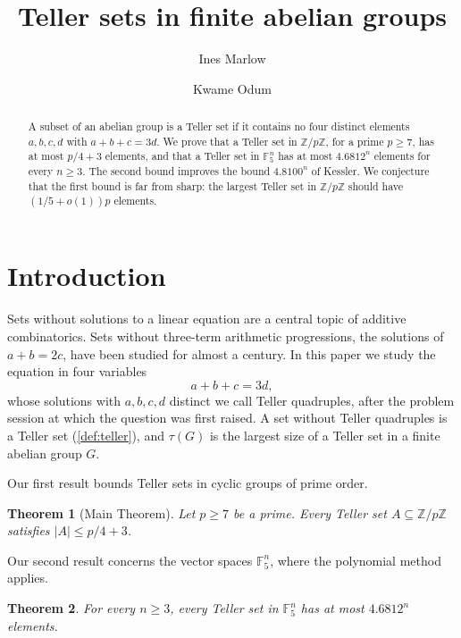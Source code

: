 \documentclass[11pt]{amsart}
\newtheorem{thm}{Theorem}[section]
\theoremstyle{definition}
\numberwithin{equation}{section}
\newcommand{\F}{\mathbb{F}}
\newcommand{\Z}{\mathbb{Z}}
\begin{document}
\title{Teller sets in finite abelian groups}
\author{Ines Marlow}
\author{Kwame Odum}

\begin{abstract}
A subset of an abelian group is a Teller set if it contains no four distinct elements $a, b, c, d$ with $a + b + c = 3d$. We prove that a Teller set in $\Z/p\Z$, for a prime $p \geq 7$, has at most $p/4 + 3$ elements, and that a Teller set in $\F_5^n$ has at most $4.6812^n$ elements for every $n \geq 3$. The second bound improves the bound $4.8100^n$ of Kessler. We conjecture that the first bound is far from sharp: the largest Teller set in $\Z/p\Z$ should have $(1/5 + o(1))p$ elements.
\end{abstract}

\maketitle

\section{Introduction}\label{sec:intro}

Sets without solutions to a linear equation are a central topic of additive combinatorics. Sets without three-term arithmetic progressions, the solutions of $a + b = 2c$, have been studied for almost a century. In this paper we study the equation in four variables
\begin{equation}\label{eq:teller}
a + b + c = 3d,
\end{equation}
whose solutions with $a, b, c, d$ distinct we call Teller quadruples, after the problem session at which the question was first raised. A set without Teller quadruples is a Teller set (\cref{def:teller}), and $\tau(G)$ is the largest size of a Teller set in a finite abelian group $G$.

Our first result bounds Teller sets in cyclic groups of prime order.

\begin{thm}[Main Theorem]\label{thm:main}
Let $p \geq 7$ be a prime. Every Teller set $A \subseteq \Z/p\Z$ satisfies $|A| \leq p/4 + 3$.
\end{thm}

Our second result concerns the vector spaces $\F_5^n$, where the polynomial method applies.

\begin{thm}\label{thm:F5}
For every $n \geq 3$, every Teller set in $\F_5^n$ has at most $4.6812^n$ elements.
\end{thm}
\end{document}
